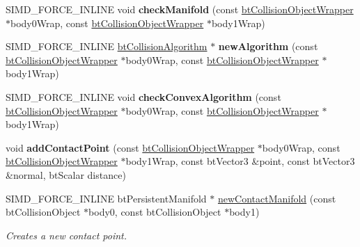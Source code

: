 \begin{DoxyCompactItemize}
\item 
\mbox{\label{classbtGImpactCollisionAlgorithm_afc77fd957d38e96422e9fea0f645ad16}} 
S\+I\+M\+D\+\_\+\+F\+O\+R\+C\+E\+\_\+\+I\+N\+L\+I\+NE void {\bfseries check\+Manifold} (const \hyperlink{structbtCollisionObjectWrapper}{bt\+Collision\+Object\+Wrapper} $\ast$body0\+Wrap, const \hyperlink{structbtCollisionObjectWrapper}{bt\+Collision\+Object\+Wrapper} $\ast$body1\+Wrap)
\item 
\mbox{\label{classbtGImpactCollisionAlgorithm_a9992300a3b680b51c546bdca268c26c4}} 
S\+I\+M\+D\+\_\+\+F\+O\+R\+C\+E\+\_\+\+I\+N\+L\+I\+NE \hyperlink{classbtCollisionAlgorithm}{bt\+Collision\+Algorithm} $\ast$ {\bfseries new\+Algorithm} (const \hyperlink{structbtCollisionObjectWrapper}{bt\+Collision\+Object\+Wrapper} $\ast$body0\+Wrap, const \hyperlink{structbtCollisionObjectWrapper}{bt\+Collision\+Object\+Wrapper} $\ast$body1\+Wrap)
\item 
\mbox{\label{classbtGImpactCollisionAlgorithm_af2e742d511464326eddcdf8266a34ab9}} 
S\+I\+M\+D\+\_\+\+F\+O\+R\+C\+E\+\_\+\+I\+N\+L\+I\+NE void {\bfseries check\+Convex\+Algorithm} (const \hyperlink{structbtCollisionObjectWrapper}{bt\+Collision\+Object\+Wrapper} $\ast$body0\+Wrap, const \hyperlink{structbtCollisionObjectWrapper}{bt\+Collision\+Object\+Wrapper} $\ast$body1\+Wrap)
\item 
\mbox{\label{classbtGImpactCollisionAlgorithm_ae8b6641aa8bacc59d362040e18a18fcc}} 
void {\bfseries add\+Contact\+Point} (const \hyperlink{structbtCollisionObjectWrapper}{bt\+Collision\+Object\+Wrapper} $\ast$body0\+Wrap, const \hyperlink{structbtCollisionObjectWrapper}{bt\+Collision\+Object\+Wrapper} $\ast$body1\+Wrap, const bt\+Vector3 \&point, const bt\+Vector3 \&normal, bt\+Scalar distance)
\item 
\mbox{\label{classbtGImpactCollisionAlgorithm_a39b6aae298182026902401b138ebd716}} 
S\+I\+M\+D\+\_\+\+F\+O\+R\+C\+E\+\_\+\+I\+N\+L\+I\+NE bt\+Persistent\+Manifold $\ast$ \hyperlink{classbtGImpactCollisionAlgorithm_a39b6aae298182026902401b138ebd716}{new\+Contact\+Manifold} (const bt\+Collision\+Object $\ast$body0, const bt\+Collision\+Object $\ast$body1)
\begin{DoxyCompactList}\small\item\em Creates a new contact point. \end{DoxyCompactList}\item 

\end{DoxyCompactItemize}
